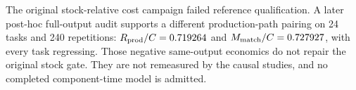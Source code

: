 The original stock-relative cost campaign failed reference qualification. A later post-hoc full-output audit supports a different production-path pairing on 24 tasks and 240 repetitions: $R_{\rm prod}/C=0.719264$ and $M_{\rm match}/C=0.727927$, with every task regressing. Those negative same-output economics do not repair the original stock gate. They are not remeasured by the causal studies, and no completed component-time model is admitted.
